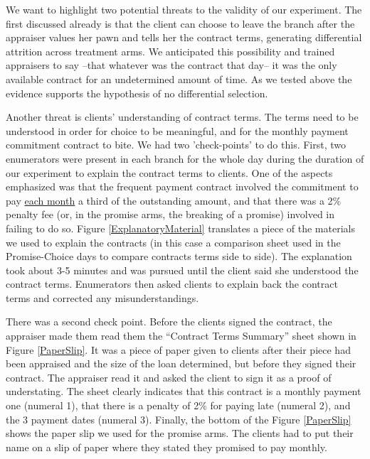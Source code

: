 \documentclass[oneside,11pt]{article}
\begin{document}
We want to highlight two potential threats to the validity of our experiment. The first discussed already is that the client can choose to leave the branch after the appraiser values her pawn and tells her the contract terms, generating differential attrition across treatment arms. We anticipated this possibility and trained appraisers to say --that whatever was the contract that day-- it was the only available contract for an undetermined amount of time. As we tested above the evidence supports the hypothesis of no differential selection. %

Another threat is clients' understanding of contract terms. The terms need to be understood in order for choice to be meaningful, and for the monthly payment commitment contract to bite. We had two 'check-points' to do this. First, two enumerators were present in each branch for the whole day during the duration of our experiment to explain the contract terms to clients. One of the aspects emphasized was that the frequent payment contract involved the commitment to pay \underline{each month} a third of the outstanding amount, and that there was a 2\% penalty fee (or, in the promise arms, the breaking of a promise) involved in failing to do so.  Figure \ref{ExplanatoryMaterial} translates a piece of the materials we used to explain the contracts (in this case a comparison sheet used in the Promise-Choice days to compare contracts terms side to side). The explanation took about 3-5 minutes and was pursued until the client said she understood the contract terms. Enumerators then asked clients to explain back the contract terms and corrected any misunderstandings. 

There was a second check point. Before the clients signed the contract, the appraiser made them read them the ``Contract Terms Summary'' sheet shown in Figure \ref{PaperSlip}. It was a piece of paper given to clients after their piece had been appraised and the size of the loan determined, but before they signed their contract. The appraiser read it and asked the client to sign it as a proof of understating. The sheet clearly indicates that this contract is a monthly payment one (numeral 1), that there is a penalty of 2\% for paying late (numeral 2), and the 3 payment dates (numeral 3). Finally, the bottom of the Figure \ref{PaperSlip} shows the paper slip we used for the promise arms. The clients had to put their name on a slip of paper where they stated they promised to pay monthly.
\end{document}
